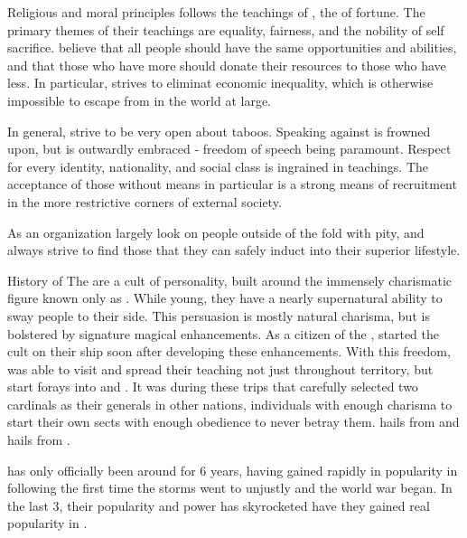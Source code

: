 \documentclass[blue]{GL2020}
\begin{document}
\name{\bCult{}}

Religious and moral principles
\pCult{} follows the teachings of \cCultGod, the \cCultGod{\god} of fortune. The primary themes of their teachings are equality, fairness, and the nobility of self sacrifice. \pCult believe that all people should have the same opportunities and abilities, and that those who have more should donate their resources to those who have less. In particular, \pCult{} strives to eliminat economic inequality, which is otherwise impossible to escape from in the world at large.

In general, \pCult strive to be very open about taboos. Speaking against \pCult is frowned upon, but is outwardly embraced - freedom of speech being paramount. Respect for every identity, nationality, and social class is ingrained in \pCult teachings. The acceptance of those without means in particular is a strong means of recruitment in the more restrictive corners of external society.

As an organization \pCult largely look on people outside of the fold with pity, and always strive to find those that they can safely induct into their superior lifestyle.




History of \pCult
The \pCult are a cult of personality, built around the immensely charismatic figure known only as \cCultLeader. While young, they have a nearly supernatural ability to sway people to their side. This persuasion is mostly natural charisma, but is bolstered by signature magical enhancements. As a citizen of the \pViking, \cCultLeader started the cult on their ship soon after developing these enhancements. With this freedom, \cCultLeader{\they} was able to visit and spread their teaching not just throughout \pViking territory, but start forays into \pTech and \pFarm. It was during these trips that \cCultLeader carefully selected two cardinals as their generals in other nations, individuals with enough charisma to start their own sects with enough obedience to never betray them. \cTechCardinal hails from \pTech and \cFarmCardinal hails from \pFarm.

\pCult has only officially been around for 6 years, having gained rapidly in popularity  in \pViking{} following the first time the storms went to \pViking unjustly and the world war began. In the last 3, their popularity and power has skyrocketed have they gained real popularity in \pViking.
\end{document}
